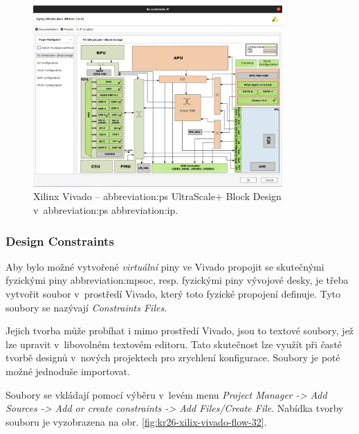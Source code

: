 \documentclass[a4paper, twoside, 11pt]{article}
\begin{document}
				\begin{figure}[htbp!]
					\centering
					\includegraphics[width=0.85\textwidth]{src/png/kr26-xilinx-vivado-flow/kr26-xilix-vivado-flow-28.jpg}
					\caption{Xilinx Vivado – \gls{abbreviation:ps} UltraScale+ Block Design v~\gls{abbreviation:ps} \gls{abbreviation:ip}.}
					\label{fig:kr26-xilix-vivado-flow-28}
				\end{figure}

			\subsubsection{Design Constraints}
				Aby bylo možné vytvořené \textit{virtuální} piny ve Vivado propojit se skutečnými fyzickými piny \gls{abbreviation:mpsoc}, resp. fyzickými piny vývojové desky, je třeba vytvořit soubor v~prostředí Vivado, který toto fyzické propojení definuje. Tyto soubory se nazývají \textit{Constraints Files}.\par
				Jejich tvorba může probíhat i mimo prostředí Vivado, jsou to textové soubory, jež lze upravit v~libovolném textovém editoru. Tato skutečnost lze využít při časté tvorbě designů v~nových projektech pro zrychlení konfigurace. Soubory je poté možné jednoduše importovat.\par
				Soubory se vkládají pomocí výběru v~levém menu \textit{Project Manager -> Add Sources -> Add or create constraints -> Add Files/Create File}. Nabídka tvorby souboru je vyzobrazena na obr. \ref{fig:kr26-xilix-vivado-flow-32}.\par
\end{document}
